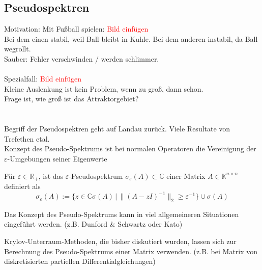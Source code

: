 \subsection{Pseudospektren}
Motivation:
Mit Fußball spielen: \textcolor{red}{Bild einfügen} \\
Bei dem einen stabil, weil Ball bleibt in Kuhle. Bei dem anderen instabil, da Ball wegrollt.
\\
Sauber: Fehler verschwinden / werden schlimmer. \\ \\
Spezialfall: \textcolor{red}{Bild einfügen} \\
Kleine Auslenkung ist kein Problem, wenn zu groß, dann schon. \\
Frage ist, wie groß ist das Attraktorgebiet? \\ \\ \\

Begriff der Pseudospektren geht auf Landau zurück. Viele Resultate von Trefethen etal. \\
Konzept des Pseudo-Spektrums ist bei normalen Operatoren die Vereinigung der $\varepsilon$-Umgebungen seiner Eigenwerte

\begin{defbox}
    Für $\varepsilon\in\mathbb{R}_+$, ist das $\varepsilon$-Pseudospektrum $\sigma_\varepsilon(A)\subset\mathbb{C}$ 
    einer Matrix $A\in\mathbb{K}^{n\times n}$ definiert als 
    \[
        \sigma_\varepsilon(A) := \{z\in\mathbb{C}\sigma(A)\,|\, \|(A-zI)^{-1}\|_2\geq \varepsilon^{-1}\} \cup \sigma(A)
    \]
\end{defbox}

\begin{rembox}
    Das Konzept des Pseudo-Spektrums kann in viel allgemeineren Situationen eingeführt werden. 
    (z.B. Dunford \& Schwartz oder Kato)
\end{rembox}

\begin{rembox}
    Krylov-Unterraum-Methoden, die bisher diskutiert wurden, lassen sich zur Berechnung des Pseudo-Spektrums einer 
    Matrix verwenden. (z.B. bei Matrix von diskretisierten partiellen Differentialgleichungen)
\end{rembox}

